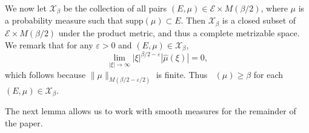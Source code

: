 \documentclass[12pt,reqno]{article}
\numberwithin{equation}{section}
\DeclareMathOperator{\fordim}{\dim_{\mathbf{F}}}
\newtheorem{theorem}{Theorem}
\begin{document}
We now let $\mathcal{X}_\beta$ be the collection of all pairs $(E,\mu) \in \mathcal{E} \times M(\beta/2)$, where $\mu$ is a probability measure such that $\text{supp}(\mu) \subset E$. Then $\mathcal{X}_\beta$ is a closed subset of $\mathcal{E} \times M(\beta/2)$ under the product metric, and thus a complete metrizable space. We remark that for any $\varepsilon > 0$ and $(E,\mu) \in \mathcal{X}_\beta$,
%
\begin{equation} \label{equationGFSCSC4}
    \lim_{|\xi| \to \infty} |\xi|^{\beta/2 - \varepsilon} |\widehat{\mu}(\xi)| = 0,
\end{equation}
%
which follows because $\| \mu \|_{M(\beta/2 - \varepsilon/2)}$ is finite. Thus $\fordim(\mu) \geq \beta$ for each $(E,\mu) \in \mathcal{X}_\beta$.
\begin{comment}
\begin{theorem}
    $\mathcal{X}$ is a closed subset of $\mathcal{E} \times M(\beta)$.
\end{theorem}
\begin{proof}
    Suppose $\{ (E_k,\mu_k) \}$ is a sequence of elements of $\mathcal{X}$ converging to some tuple $(E,\mu) \in \mathcal{E} \times M(\beta)$. Fix $\varepsilon > 0$. Since $E_k \to E$ in the Hausdorff dimension, there exists $k_0$ such that for $k \geq k_0$, $E_k \subset E(\varepsilon)$. Since $\mu_k \to \mu$ weakly, this implies that $\mu$ is a probability measure, and that $\text{supp}(\mu) \subset E(\varepsilon)$. Taking $\varepsilon \to 0$ shows that $\text{supp}(\mu) \subset E$. Again for a fixed $\varepsilon > 0$, applying the triangle inequality and the reverse triangle inequality combined with \eqref{equationGFSCSC4} applied to $\mu_k$, we conclude
    \[ \lim_{|\xi| \to \infty} |\xi|^{\beta/2 - \varepsilon} |\widehat{\mu}(\xi)| = \lim_{|\xi| \to \infty} |\xi|^{\beta/2 - \varepsilon} |\widehat{\mu}(\xi) - \widehat{\mu_k}(\xi)| \leq \| \mu - \mu_k \|_{M(\beta,\varepsilon)}. \]
    Taking $k \to \infty$ shows that
    \[ \lim_{|\xi| \to \infty} |\xi|^{\beta/2 - \varepsilon} |\widehat{\mu}(\xi)| = 0, \]
    which completes the proof.
\end{proof}
\end{comment}

The next lemma allows us to work with smooth measures for the remainder of the paper.
\end{document}
